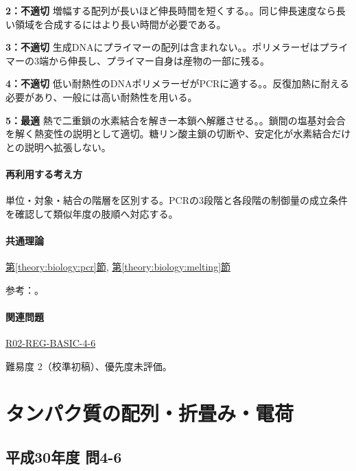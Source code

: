 \noindent\textbf{2：不適切} 増幅する配列が長いほど伸長時間を短くする。。同じ伸長速度なら長い領域を合成するにはより長い時間が必要である。\par

\noindent\textbf{3：不適切} 生成DNAにプライマーの配列は含まれない。。ポリメラーゼはプライマーの3端から伸長し、プライマー自身は産物の一部に残る。\par

\noindent\textbf{4：不適切} 低い耐熱性のDNAポリメラーゼがPCRに適する。。反復加熱に耐える必要があり、一般には高い耐熱性を用いる。\par

\noindent\textbf{5：最適} 熱で二重鎖の水素結合を解き一本鎖へ解離させる。。鎖間の塩基対会合を解く熱変性の説明として適切。糖リン酸主鎖の切断や、安定化が水素結合だけとの説明へ拡張しない。\par

\paragraph{再利用する考え方} 単位・対象・結合の階層を区別する。PCRの3段階と各段階の制御量の成立条件を確認して類似年度の肢順へ対応する。

\paragraph{共通理論} \hyperref[theory:biology:pcr]{第\ref*{theory:biology:pcr}節}, \hyperref[theory:biology:melting]{第\ref*{theory:biology:melting}節}

\par 参考：\cite{neb_pcr}。

\paragraph{関連問題} \hyperref[q:r02-reg-basic-4-6]{R02-REG-BASIC-4-6}

\par 難易度 2（校準初稿）、優先度未評価。

\section{タンパク質の配列・折畳み・電荷}

\subsection{平成30年度 問4-6}
\label{q:h30-reg-basic-4-6}

